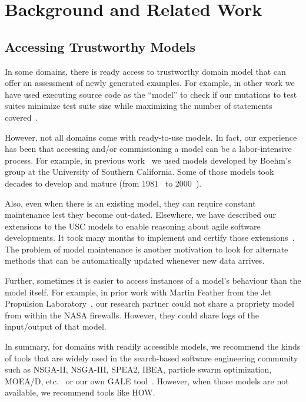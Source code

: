 \documentclass[conference]{IEEEtran}
\begin{document}
\section{Background and Related Work}
\subsection{Accessing Trustworthy Models}

In some domains, there is ready access to 
trustworthy domain model that can offer an assessment
of newly generated examples. For example, in other work
we have used executing source code as the ``model'' to check
if our mutations to test suites
  minimize
test suite size while maximizing the number of statements covered~\cite{me09m,andrews07,andrews10}.

However, not all domains come with ready-to-use models.
In fact, our experience has been that accessing and/or commissioning
a model can be a labor-intensive process.
For  example, in previous work~\cite{me07f} we used models
developed by Boehm's group at the University of Southern California.
Some of those models took decades to develop and mature (from 1981~\cite{boehm81} to 2000~\cite{boehm00b}). 

Also, even when there is an existing model, they can require
constant  maintenance lest they become out-dated. Elsewhere, we have described our
extensions to the USC models to enable reasoning about agile software developments. 
It took many months to implement and certify those extensions~\cite{me09i,me09j}.
The problem of model maintenance is another
motivation to look for alternate methods that can be automatically updated whenever new data arrives.

Further, sometimes  it is easier to access instances of a model's behaviour than the model
itself. For example, in prior work with Martin  Feather from the Jet Propulsion
Laboratory~\cite{fea02a},  our research partner could not share a
propriety model from within the NASA firewalls. However, they could share 
logs of the input/output of that model.

In summary, for domains with readily accessible models, we recommend
the kinds of tools that are widely used in the search-based
software engineering community such as NSGA-II, NSGA-III, SPEA2, IBEA, particle swarm optimization, MOEA/D, etc.~\cite{deb00a,zit02,zit04,%
deb14,Cui2005a,zhang07:TEC} or our own GALE tool~\cite{krall14}. However,
when those models are not available, we recommend tools like HOW.
\end{document}
